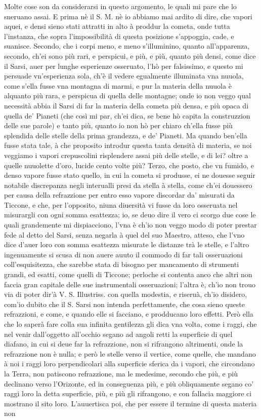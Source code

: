 \documentclass[11pt,twoside,openany]{book}
\begin{document}
Molte cose son da considerarsi in questo argomento, le quali mi pare che lo sneruano assai. E prima nè il S. M. nè io abbiamo mai ardito di dire, che vapori aquei, e densi sieno stati attratti in alto à proddur la cometa, onde tutta l'instanza, che sopra l'impossibilità di questa posizione s'appoggia, cade, e suanisce. Secondo, che i corpi meno, e meno s'illuminino, quanto all'apparenza, secondo, ch'ei sono più rari, e perspicui, e più, e più, quanto più densi, come dice il Sarsi, auer per lunghe esperienze osseruato, l'hò per falsissimo, e questo mi persuade vn'esperienza sola, ch'è il vedere egualmente illuminata vna nuuola, come s'ella fusse vna montagna di marmi, e pur la materia della nuuola è alquanto più rara, e perspicua di quella delle montagne; onde io non veggo qual necessità abbia il Sarsi di far la materia della cometa più densa, e più opaca di quella de' Pianeti (che così mi par, ch'ei dica, se bene hò capita la construzzion delle sue parole) e tanto più, quanto io non hò per chiaro ch'ella fusse più splendida delle stelle della prima grandezza, e de' Pianeti. Ma quando ben'ella fusse stata tale, à che proposito introdur questa tanta densità di materia, se noi veggiamo i vapori crepuscolini risplendere assai più delle stelle, e di lei? oltre a quelle nuuolette d'oro, lucide cento volte più? Terzo, che posto, che vn fumido, e denso vapore fusse stato quello, in cui la cometa si produsse, ei ne douesse seguir notabile discrepanza negli interualli presi da stella à stella, come ch'ei douessero per causa della refrazzione per entro esso vapore discordar da' misurati da Ticcone, e che, per l'opposito, niuna diuersità vi fusse da loro osseruata nel misurargli con ogni somma esattezza; io, se deuo dire il vero ci scorgo due cose le quali grandemente mi dispiacciono, l'vna è ch'io non veggo modo di poter prestar fede al detto del Sarsi, senza negarla à quel del suo Maestro, atteso, che l'vno dice d'auer loro con somma esattezza misurate le distanze trà le stelle, e l'altro ingenuamente si scusa di non auere auuto il commodo di far tali osseruazioni coll'esquisitezza, che sarebbe stata di bisogno per mancamento di strumenti grandi, ed esatti, come quelli di Ticcone; perloche si contenta anco che altri non faccia gran capitale delle sue instrumentali osseruazioni; l'altra è, ch'io non trouo via di poter dir'à V. S. Illustriss. con quella modestia, e riseruà, ch'io disidero, com'io dubito che il S. Sarsi non intenda perfettamente, che cosa sieno queste refrazzioni, e come, e quando elle si facciano, e prodducano loro effetti. Però ella che lo saperà fare colla sua infinita gentilezza gli dica vna volta, come i raggi, che nel venir dall'oggetto all'occhio segano ad angoli retti la superficie di quel diafano, in cui si deue far la refrazzione, non si rifrangono altrimenti, onde la refrazzione non è nulla; e però le stelle verso il vertice, come quelle, che mandano à noi i raggi loro perpendicolari alla superficie sferica da i vapori, che circondano la Terra, non patiscono refrazzione, ma le medesime, secondo che più, e più declinano verso l'Orizonte, ed in conseguenza più, e più obliquamente segano co' raggi loro la detta superficie, più, e più gli rifrangono, e con fallacia maggiore ci mostrano il sito loro. L'auuertisca poi, che per essere il termine di questa materia non 
\end{document}
